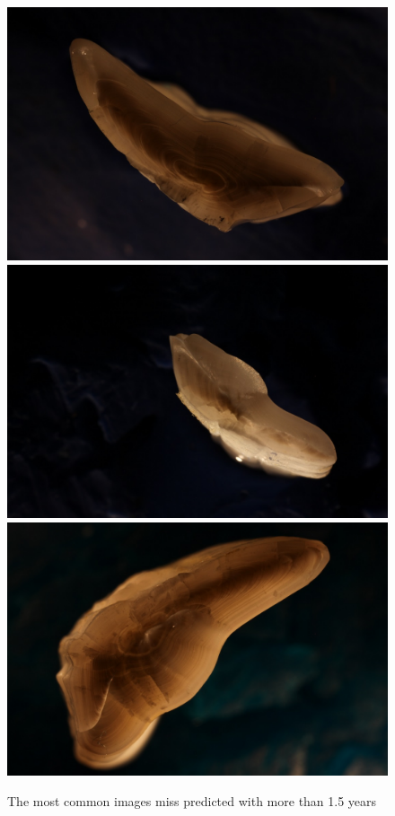 \documentclass[10pt,letterpaper]{article}
\begin{document}
\begin{figure}[h!]
  \caption{The most common images miss predicted with more than 1.5 years}
  \centering
  \includegraphics[scale=0.1]{outliers/IMG_0284_13.JPG}
  \includegraphics[scale=0.1]{outliers/IMG_0230_71.JPG}
  \includegraphics[scale=0.1]{outliers/IMG_0104_270.JPG}

\end{figure}
\end{document}
